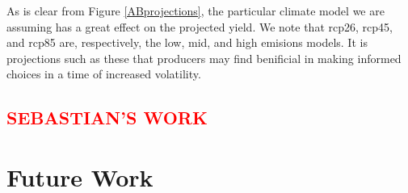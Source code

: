 \documentclass[11pt]{article}
\numberwithin{equation}{section}
\numberwithin{figure}{section}
\newcommand{\rred}[1]{\textcolor{red}{#1}}
\begin{document}
As is clear from Figure \ref{ABprojections}, the particular climate model we are assuming has a great effect on the projected yield. We note that rcp26, rcp45, and rcp85 are, respectively, the low, mid, and high emisions models. It is projections such as these that producers may find benificial in making informed choices in a time of increased volatility.

\subsection{\rred{SEBASTIAN'S WORK}}%

\section{Future Work}
\end{document}
